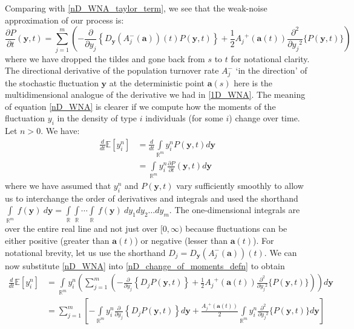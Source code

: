 Comparing with \eqref{nD_WNA_taylor_term}, we see that the weak-noise approximation of our process is:
\begin{equation}
\label{nD_WNA}
\frac{\partial P}{\partial t}(\mathbf{y},t) = \sum\limits_{j=1}^{m}\left(-\frac{\partial}{\partial y_j}\left\{D_{\mathbf{y}}(A_j^-(\mathbf{a}))(t)P(\mathbf{y},t)\right\}+\frac{1}{2}{A_j}^{+}(\mathbf{a}(t))\frac{\partial^2}{\partial{y_j}^2}\{P(\mathbf{y},t)\}\right)
\end{equation}
where we have dropped the tildes and gone back from $s$ to $t$ for notational clarity. The directional derivative of the population turnover rate $A_j^-$ `in the direction' of the stochastic fluctuation $\mathbf{y}$ at the deterministic point $\mathbf{a}(s)$ here is the multidimensional analogue of the derivative we had in \eqref{1D_WNA}. The meaning of equation \eqref{nD_WNA} is clearer if we compute how the moments of the fluctuation $y_i$ in the density of type $i$ individuals (for some $i$) change over time. Let $n > 0$. We have:
\begin{align}
\frac{d}{dt}\mathbb{E}[y_i^n] &= \frac{d}{dt}\int\limits_{\mathbb{R}^m}y_i^nP(\mathbf{y},t)d\mathbf{y}\\
&= \int\limits_{\mathbb{R}^m}y_i^n\frac{\partial P}{\partial t}(\mathbf{y},t)d\mathbf{y}\label{nD_change_of_moments_defn}
\end{align}
where we have assumed that $y_i^n$ and $P(\mathbf{y},t)$ vary sufficiently smoothly to allow us to interchange the order of derivatives and integrals and used the shorthand $\displaystyle \int\limits_{\mathbb{R}^m} \ f(\mathbf{y}) \ d\mathbf{y} = \int\limits_{\mathbb{R}}\int\limits_{\mathbb{R}}\cdots\int\limits_{\mathbb{R}} \ f(\mathbf{y}) \ dy_1 dy_2 \ldots dy_m$. The one-dimensional integrals are over the entire real line and not just over $[0,\infty)$ because fluctuations can be either positive (greater than $\mathbf{a}(t)$) or negative (lesser than $\mathbf{a}(t)$). For notational brevity, let us use the shorthand $D_j = D_{\mathbf{y}}(A_j^-(\mathbf{a}))(t)$. We can now substitute \eqref{nD_WNA} into \eqref{nD_change_of_moments_defn} to obtain
\begin{align}
\frac{d}{dt}\mathbb{E}[y_i^n] &= \int\limits_{\mathbb{R}^m} y_i^n \left(\sum\limits_{j=1}^{m}\left(-\frac{\partial}{\partial y_j}\left\{D_{j}P(\mathbf{y},t)\right\}+\frac{1}{2}{A_j}^{+}(\mathbf{a}(t))\frac{\partial^2}{\partial{y_j}^2}\{P(\mathbf{y},t)\}\right)\right)d\mathbf{y}\\
&= \sum\limits_{j=1}^{m}\left[-\int\limits_{\mathbb{R}^m} y_i^n\frac{\partial}{\partial y_j}\left\{D_{j}P(\mathbf{y},t)\right\}d\mathbf{y} + \frac{{A_j}^{+}(\mathbf{a}(t))}{2}\int\limits_{\mathbb{R}^m} y_i^n\frac{\partial^2}{\partial{y_j}^2}\{P(\mathbf{y},t)\}d\mathbf{y}\right]\label{nD_intermediate_for_moments}
\end{align}
